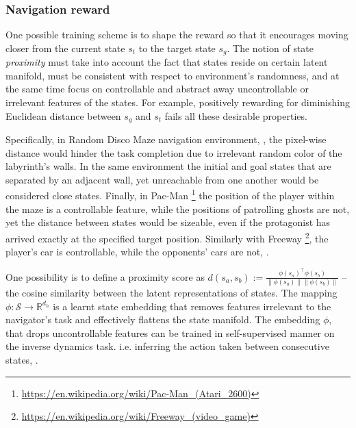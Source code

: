 \documentclass[acmsmall, nonacm]{acmart}
\begin{document}
\subsubsection{Navigation reward}
\label{ssub:navigation_reward}

One possible training scheme is to shape the reward so that it encourages moving closer from the current state $s_t$ to the target state $s_g$. The notion of state \emph{proximity} must take into account the fact that states reside on certain latent manifold, must be consistent with respect to environment's randomness, and at the same time focus on controllable and abstract away uncontrollable or irrelevant features of the states. For example, positively rewarding for diminishing Euclidean distance between $s_g$ and $s_t$ fails all these desirable properties.

Specifically, in Random Disco Maze navigation environment, \citep{badia_never_2020}, the pixel-wise distance would hinder the task completion due to irrelevant random color of the labyrinth's walls. In the same environment the initial and goal states that are separated by an adjacent wall, yet unreachable from one another would be considered close states. Finally, in Pac-Man%
\footnote{
    \url{https://en.wikipedia.org/wiki/Pac-Man_(Atari_2600)}
}
the position of the player within the maze is a controllable feature, while the positions of patrolling ghosts are not, yet the distance between states would be sizeable, even if the protagonist has arrived exactly at the specified target position.
%
Similarly with Freeway%
\footnote{
    \url{https://en.wikipedia.org/wiki/Freeway_(video_game)}
}, the player's car is controllable, while the opponents' cars are not, \citep[fig.~1]{choi_contingency-aware_2019}.


One possibility is to define a proximity score as $
    d(s_a, s_b) 
        := \frac{\phi(s_a)^\top \phi(s_b)}{\|\phi(s_a)\|\|\phi(s_b)\|}
$ -- the cosine similarity between the latent representations of states. The mapping $
    \phi \colon \mathcal{S} \to \mathbb{R}^{d_h}
$ is a learnt state embedding that removes features irrelevant to the navigator's task and effectively flattens the state manifold. The embedding $\phi$, that drops uncontrollable features can be trained in self-supervised manner on the inverse dynamics task. i.e. inferring the action taken between consecutive states, \citep{choi_contingency-aware_2019,badia_never_2020}.
\end{document}
